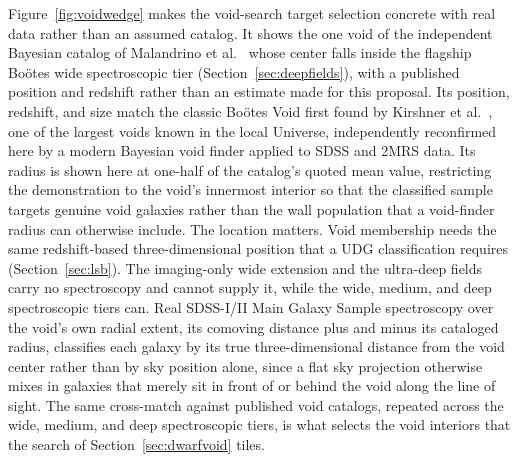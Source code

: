 \documentclass[10pt,onecolumn]{article}
\begin{document}
Figure~\ref{fig:voidwedge} makes the void-search target selection concrete with real data rather than an assumed catalog. It shows the one void of the independent Bayesian catalog of Malandrino et al.\ \cite{malandrino2026} whose center falls inside the flagship Bo\"otes wide spectroscopic tier (Section~\ref{sec:deepfields}), with a published position and redshift rather than an estimate made for this proposal. Its position, redshift, and size match the classic Bo\"otes Void first found by Kirshner et al.\ \cite{kirshner1981,kirshner1987}, one of the largest voids known in the local Universe, independently reconfirmed here by a modern Bayesian void finder applied to SDSS and 2MRS data. Its radius is shown here at one-half of the catalog's quoted mean value, restricting the demonstration to the void's innermost interior so that the classified sample targets genuine void galaxies rather than the wall population that a void-finder radius can otherwise include. The location matters. Void membership needs the same redshift-based three-dimensional position that a UDG classification requires (Section~\ref{sec:lsb}). The imaging-only wide extension and the ultra-deep fields carry no spectroscopy and cannot supply it, while the wide, medium, and deep spectroscopic tiers can. Real SDSS-I/II Main Galaxy Sample spectroscopy over the void's own radial extent, its comoving distance plus and minus its cataloged radius, classifies each galaxy by its true three-dimensional distance from the void center rather than by sky position alone, since a flat sky projection otherwise mixes in galaxies that merely sit in front of or behind the void along the line of sight. The same cross-match against published void catalogs, repeated across the wide, medium, and deep spectroscopic tiers, is what selects the void interiors that the search of Section~\ref{sec:dwarfvoid} tiles.
\end{document}
